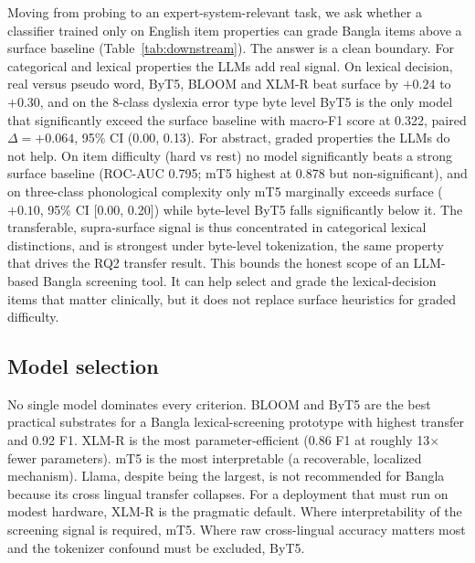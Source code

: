 \documentclass[preprint,12pt,authoryear]{elsarticle}
\begin{document}
Moving from probing to an expert-system-relevant task, we ask whether a classifier trained only on English item properties can grade Bangla items above a surface baseline (Table~\ref{tab:downstream}). The answer is a clean boundary. For categorical and lexical properties the LLMs add real signal. On lexical decision, real versus pseudo word, ByT5, BLOOM and XLM-R beat surface by $+0.24$ to $+0.30$, and on the 8-class dyslexia error type byte level ByT5 is the only model that significantly exceed the surface baseline with macro-F1 score at 0.322, paired $\Delta{=}{+}0.064$, 95\% CI (0.00, 0.13). For abstract, graded properties the LLMs do not help. On item difficulty (hard vs rest) no model significantly beats a strong surface baseline (ROC-AUC 0.795; mT5 highest at 0.878 but non-significant), and on three-class phonological complexity only mT5 marginally exceeds surface ($+0.10$, 95\% CI [0.00, 0.20]) while byte-level ByT5 falls significantly below it. The transferable, supra-surface signal is thus concentrated in categorical lexical distinctions, and is strongest under byte-level tokenization, the same property that drives the RQ2 transfer result. This bounds the honest scope of an LLM-based Bangla screening tool. It can help select and grade the lexical-decision items that matter clinically, but it does not replace surface heuristics for graded difficulty.

\subsection{Model selection}
No single model dominates every criterion. BLOOM and ByT5 are the best practical substrates for a Bangla lexical-screening prototype with highest transfer and 0.92 F1. XLM-R is the most parameter-efficient (0.86 F1 at roughly 13$\times$ fewer parameters). mT5 is the most interpretable (a recoverable, localized mechanism). Llama, despite being the largest, is not recommended for Bangla because its cross lingual transfer collapses. For a deployment that must run on modest hardware, XLM-R is the pragmatic default. Where interpretability of the screening signal is required, mT5. Where raw cross-lingual accuracy matters most and the tokenizer confound must be excluded, ByT5.

\end{document}
